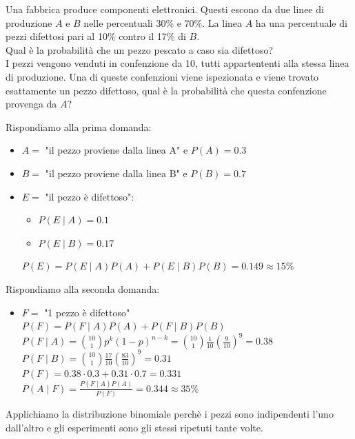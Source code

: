 \documentclass[12pt]{report}
\newcounter{exercise}
\begin{document}
  	\begin{exercise}{}{}
  		\begin{assignment}{}{}
  			Una fabbrica produce componenti elettronici. Questi escono da due linee di produzione $A$ e $B$ nelle percentuali $30$\% e 70\%. La linea $A$ ha una percentuale di pezzi difettosi pari al 10\% contro il 17\% di $B$. \\
  			Qual è la probabilità che un pezzo pescato a caso sia difettoso? \\
  			I pezzi vengono venduti in confenzione da 10, tutti appartententi alla stessa linea di produzione. Una di queste confenzioni viene ispezionata e viene trovato esattamente un pezzo difettoso, qual è la probabilità che questa confenzione provenga da $A$?
  		\end{assignment}
  		Rispondiamo alla prima domanda:
  		\begin{itemize}
  			\item $A =$ "il pezzo proviene dalla linea A" e $P(A) = 0.3$
  			\item $B =$ "il pezzo proviene dalla linea B" e $P(B) = 0.7$
  			\item $E =$ "il pezzo è difettoso":
  			\begin{itemize}
  				\item $P(E \mid A) = 0.1$
  				\item $P(E \mid B) = 0.17$
  			\end{itemize}
  			$P(E) = P(E \mid A)P(A) + P(E \mid B)P(B) = 0.149 \approx 15\%$
  		\end{itemize}
  		Rispondiamo alla seconda domanda:
  		\begin{itemize}
  			\item $F = $ "1 pezzo è difettoso" \\
  			$P(F) = P(F \mid A)P(A) + P(F \mid B)P(B)$ \\
  			$P(F \mid A) = \binom{10}{1}p^k(1-p)^{n-k} = \binom{10}{1}\frac{1}{10}(\frac{9}{10})^9 = 0.38$ \\
  			$P(F \mid B) = \binom{10}{1}\frac{17}{10}(\frac{83}{10})^9 = 0.31$ \\
  			$P(F) = 0.38 \cdot 0.3 + 0.31 \cdot 0.7 = 0.331$ \\
  			$P(A \mid F) = \frac{P(F\mid A)P(A)}{P(F)} = 0.344 \approx 35\%$
  		\end{itemize}
  		Applichiamo la distribuzione binomiale perchè i pezzi sono indipendenti l'uno dall'altro e gli esperimenti sono gli stessi ripetuti tante volte.
  	\end{exercise}
\end{document}
